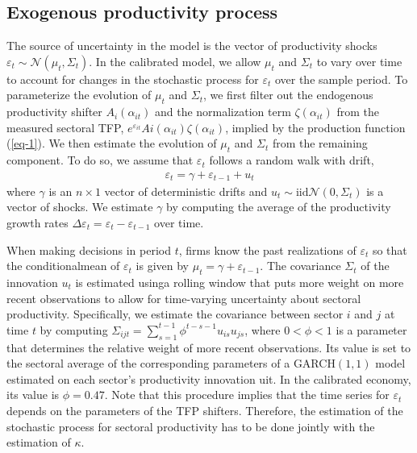 \documentclass[11pt]{article}
\theoremstyle{definition}
\begin{document}
	\subsection*{Exogenous productivity process}
	The source of uncertainty in the model is the vector of productivity shocks $\varepsilon_t \sim \mathcal{N} (\mu_t, \Sigma_t)$. In the calibrated model, we allow $\mu_t$ and $\Sigma_t$ to vary over time to account for changes in the stochastic process for $\varepsilon_t$ over the sample period. To parameterize the evolution of $\mu_t$ and $\Sigma_t$, we first filter out the endogenous productivity shifter $A_i (\alpha_{it})$ and the normalization term $\zeta(\alpha_{it})$ from the measured sectoral TFP, $e^{\varepsilon_{it}}Ai(\alpha_{it})\zeta(\alpha_{it})$, implied by the production function (\ref{eq-1}). We then estimate the evolution of $\mu_t$ and $\Sigma_t$ from the remaining component. To do so, we assume that $\varepsilon_t$ follows a random walk with drift,
	\begin{align}
		\varepsilon_t = \gamma + \varepsilon_{t-1} + u_t \label{eq1-42} 
	\end{align}
	where $\gamma$ is an $n × 1$ vector of deterministic drifts and $u_t \sim \text{iid}\mathcal{N}(0, \Sigma_t)$ is a vector of shocks. We estimate $\gamma$ by computing the average of the productivity growth rates $\Delta\varepsilon_t = \varepsilon_t - \varepsilon_{t-1}$ over time.
	
	When making decisions in period $t$, firms know the past realizations of $\varepsilon_t$ so that the conditionalmean of $\varepsilon_t$ is given by $\mu_t = \gamma + \varepsilon_{t-1}$. The covariance $\Sigma_t$ of the innovation $u_t$ is estimated usinga rolling window that puts more weight on more recent observations to allow for time-varying uncertainty about sectoral productivity. Specifically, we estimate the covariance between sector $i$ and $j$ at time $t$ by computing $\Sigma_{ijt} = \sum\limits_{s=1}^{t-1}\phi^{t-s-1}u_{is}u_{js}$, where $0 < \phi < 1$ is a parameter that determines the relative weight of more recent observations. Its value is set to the sectoral average of the corresponding parameters of a GARCH$(1,1)$ model estimated on each sector’s productivity innovation uit. In the calibrated economy, its value is $\phi = 0.47$. Note that this procedure implies that the time series for $\varepsilon_t$ depends on the parameters of the TFP shifters. Therefore, the estimation of the stochastic process for sectoral productivity has to be done jointly with the estimation of $\kappa$.
	
\end{document}
